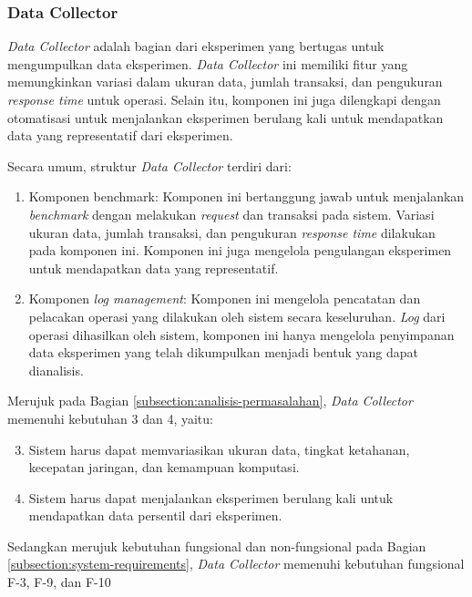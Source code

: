 \subsubsection{Data Collector}
\label{subsubsection:data-collector}

\textit{Data Collector} adalah bagian dari eksperimen yang bertugas untuk mengumpulkan data eksperimen. \textit{Data Collector} ini memiliki fitur yang memungkinkan variasi dalam ukuran data, jumlah transaksi, dan pengukuran \textit{response time} untuk operasi. Selain itu, komponen ini juga dilengkapi dengan otomatisasi untuk menjalankan eksperimen berulang kali untuk mendapatkan data yang representatif dari eksperimen.

Secara umum, struktur \textit{Data Collector} terdiri dari:

\begin{enumerate}
	\item Komponen benchmark: Komponen ini bertanggung jawab untuk menjalankan \textit{benchmark} dengan melakukan \textit{request} dan transaksi pada sistem. Variasi ukuran data, jumlah transaksi, dan pengukuran \textit{response time} dilakukan pada komponen ini. Komponen ini juga mengelola pengulangan eksperimen untuk mendapatkan data yang representatif.
	\item Komponen \textit{log management}: Komponen ini mengelola pencatatan dan pelacakan operasi yang dilakukan oleh sistem secara keseluruhan. \textit{Log} dari operasi dihasilkan oleh sistem, komponen ini hanya mengelola penyimpanan data eksperimen yang telah dikumpulkan menjadi bentuk yang dapat dianalisis.
\end{enumerate}

Merujuk pada Bagian \ref{subsection:analisis-permasalahan}, \textit{Data Collector} memenuhi kebutuhan 3 dan 4, yaitu:

\begin{enumerate}
	\setcounter{enumi}{2}
	\item Sistem harus dapat memvariasikan ukuran data, tingkat ketahanan, kecepatan jaringan, dan kemampuan komputasi.
	\item Sistem harus dapat menjalankan eksperimen berulang kali untuk mendapatkan data persentil dari eksperimen.
\end{enumerate}

Sedangkan merujuk kebutuhan fungsional dan non-fungsional pada Bagian \ref{subsection:system-requirements}, \textit{Data Collector} memenuhi kebutuhan fungsional F-3, F-9, dan F-10
